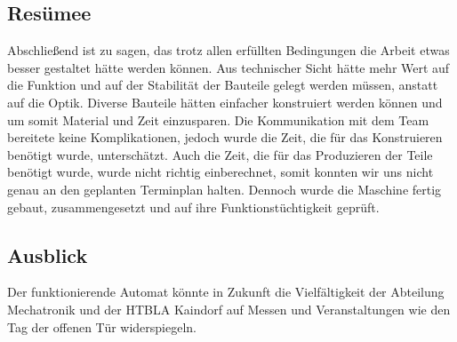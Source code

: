 \subsection{Resümee}
Abschließend ist zu sagen, das trotz allen erfüllten Bedingungen die Arbeit etwas besser gestaltet hätte werden können.
Aus technischer Sicht hätte mehr Wert auf die Funktion und auf der Stabilität der Bauteile gelegt werden müssen, anstatt
auf die Optik. Diverse Bauteile hätten einfacher konstruiert werden können und um somit Material und Zeit einzusparen.
Die Kommunikation mit dem Team bereitete keine Komplikationen, jedoch wurde die Zeit, die für das Konstruieren benötigt wurde, unterschätzt. Auch die Zeit, die für das Produzieren der Teile benötigt wurde, wurde nicht richtig einberechnet, somit
konnten wir uns nicht genau an den geplanten Terminplan halten. Dennoch wurde die Maschine fertig gebaut, zusammengesetzt
und auf ihre Funktionstüchtigkeit geprüft.

\subsection{Ausblick}
Der funktionierende Automat könnte in Zukunft die Vielfältigkeit der Abteilung Mechatronik und der HTBLA Kaindorf auf
Messen und Veranstaltungen wie den Tag der offenen Tür widerspiegeln.